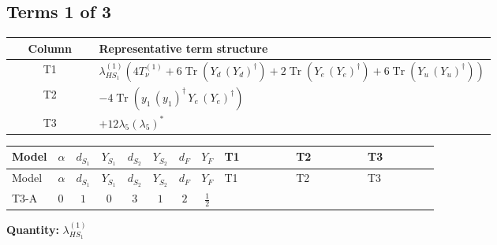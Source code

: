 \documentclass[8pt]{article}
\begin{document}
\begin{landscape}
\subsection*{Terms 1 of 3}
\begin{center}
\begin{tabular}{@{}c >{\raggedright\arraybackslash}p{0.82\linewidth}@{}}
\toprule
Column & Representative term structure \\
\midrule
T1 & \(\displaystyle {\lambda_{HS_1}^{(1)}} (4 T_{\nu}^{(1)}+6 \operatorname{Tr}\!\left({Y_d}\,\left({Y_d}\right)^{\dagger}\right)+2 \operatorname{Tr}\!\left({Y_e}\,\left({Y_e}\right)^{\dagger}\right)+6 \operatorname{Tr}\!\left({Y_u}\,\left({Y_u}\right)^{\dagger}\right))\) \\
\midrule
T2 & \(\displaystyle -4 \operatorname{Tr}\!\left({y_1}\,\left({y_1}\right)^{\dagger}\,{Y_e}\,\left({Y_e}\right)^{\dagger}\right)\) \\
\midrule
T3 & \(\displaystyle +12 {\lambda_5} \left({\lambda_5}\right)^{*}\) \\
\midrule
\bottomrule
\end{tabular}
\end{center}
\smallskip
\tiny
\begin{longtable}{@{}llcccccc >{\raggedright\arraybackslash}p{0.21\linewidth} >{\raggedright\arraybackslash}p{0.21\linewidth} >{\raggedright\arraybackslash}p{0.21\linewidth}@{}}
\toprule
Model & $\alpha$ & $d_{S_1}$ & $Y_{S_1}$ & $d_{S_2}$ & $Y_{S_2}$ & $d_F$ & $Y_F$ & T1 & T2 & T3 \\
\midrule
\endfirsthead
\toprule
Model & $\alpha$ & $d_{S_1}$ & $Y_{S_1}$ & $d_{S_2}$ & $Y_{S_2}$ & $d_F$ & $Y_F$ & T1 & T2 & T3 \\
\midrule
\endhead
T3-A & $0$ & $1$ & $0$ & $3$ & $1$ & $2$ & $\frac{1}{2}$ & \scriptsize\adjustbox{max width=\linewidth}{$\begin{gathered} {\lambda_{HS_1}^{(1)}} (4 T_{\nu}^{(1)}+6 \operatorname{Tr}\!\left({Y_d}\,\left({Y_d}\right)^{\dagger}\right)+2 \operatorname{Tr}\!\left({Y_e}\,\left({Y_e}\right)^{\dagger}\right)+6 \operatorname{Tr}\!\left({Y_u}\,\left({Y_u}\right)^{\dagger}\right))\end{gathered}$} & \scriptsize\adjustbox{max width=\linewidth}{$\begin{gathered} -4 \operatorname{Tr}\!\left({y_1}\,\left({y_1}\right)^{\dagger}\,{Y_e}\,\left({Y_e}\right)^{\dagger}\right)\end{gathered}$} & \scriptsize\adjustbox{max width=\linewidth}{$\begin{gathered} +12 {\lambda_5} \left({\lambda_5}\right)^{*}\end{gathered}$} \\
\midrule
\bottomrule
\end{longtable}
\clearpage
\noindent\textbf{Quantity: }$\lambda_{HS_1}^{(1)}$\par\smallskip

\end{landscape}
\end{document}
